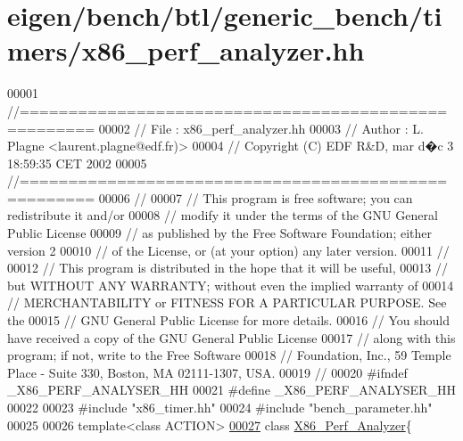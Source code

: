 \hypertarget{eigen_2bench_2btl_2generic__bench_2timers_2x86__perf__analyzer_8hh_source}{}\section{eigen/bench/btl/generic\+\_\+bench/timers/x86\+\_\+perf\+\_\+analyzer.hh}
\label{eigen_2bench_2btl_2generic__bench_2timers_2x86__perf__analyzer_8hh_source}

\begin{DoxyCode}
00001 \textcolor{comment}{//=====================================================}
00002 \textcolor{comment}{// File   :  x86\_perf\_analyzer.hh}
00003 \textcolor{comment}{// Author :  L. Plagne <laurent.plagne@edf.fr)>}
00004 \textcolor{comment}{// Copyright (C) EDF R&D,  mar d�c 3 18:59:35 CET 2002}
00005 \textcolor{comment}{//=====================================================}
00006 \textcolor{comment}{//}
00007 \textcolor{comment}{// This program is free software; you can redistribute it and/or}
00008 \textcolor{comment}{// modify it under the terms of the GNU General Public License}
00009 \textcolor{comment}{// as published by the Free Software Foundation; either version 2}
00010 \textcolor{comment}{// of the License, or (at your option) any later version.}
00011 \textcolor{comment}{//}
00012 \textcolor{comment}{// This program is distributed in the hope that it will be useful,}
00013 \textcolor{comment}{// but WITHOUT ANY WARRANTY; without even the implied warranty of}
00014 \textcolor{comment}{// MERCHANTABILITY or FITNESS FOR A PARTICULAR PURPOSE.  See the}
00015 \textcolor{comment}{// GNU General Public License for more details.}
00016 \textcolor{comment}{// You should have received a copy of the GNU General Public License}
00017 \textcolor{comment}{// along with this program; if not, write to the Free Software}
00018 \textcolor{comment}{// Foundation, Inc., 59 Temple Place - Suite 330, Boston, MA  02111-1307, USA.}
00019 \textcolor{comment}{//}
00020 \textcolor{preprocessor}{#ifndef \_X86\_PERF\_ANALYSER\_HH}
00021 \textcolor{preprocessor}{#define \_X86\_PERF\_ANALYSER\_HH}
00022 
00023 \textcolor{preprocessor}{#include "x86\_timer.hh"}
00024 \textcolor{preprocessor}{#include "bench\_parameter.hh"}
00025 
00026 \textcolor{keyword}{template}<\textcolor{keyword}{class} ACTION>
\hyperlink{class_x86___perf___analyzer}{00027} \textcolor{keyword}{class }\hyperlink{class_x86___perf___analyzer}{X86\_Perf\_Analyzer}\{

\end{DoxyCode}
